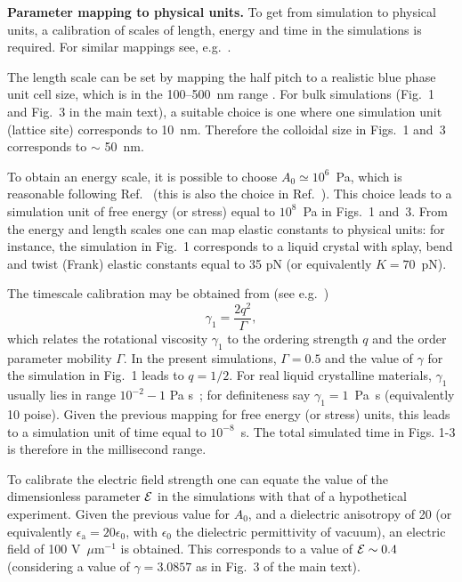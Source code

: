 \documentclass[12pt,twoside]{article}
\begin{document}
\noindent
\textbf{Parameter mapping to physical units.}
To get from simulation to physical units, a calibration of scales of
length, energy and time in the simulations is required. For similar
mappings see,
e.g.~\cite{denniston2}.

The length scale can be set by mapping the half pitch to a realistic blue
phase unit cell size, which is in the 100--500~nm range \cite{blue1}. 
For bulk simulations (Fig.~1 and Fig.~3 in the main text), a suitable choice
is one where one simulation unit (lattice site) corresponds to 10~nm. Therefore
the colloidal size in Figs.~1 and~3 corresponds to $\sim$ 50~nm. 

To obtain an energy scale, it is possible to choose $A_0 \simeq 10^6$~Pa,
which is reasonable following Ref.~\cite{blue1} (this is also the choice in
Ref.~\cite{oliver2}). This choice leads to a simulation unit of
free energy (or stress) equal to $10^{8}$~Pa in Figs.~1 and~3.
From the energy and length scales one can map elastic constants to
physical units: for instance, the simulation in Fig.~1 corresponds to
a liquid crystal with splay, bend and twist (Frank) elastic constants
equal to 35 pN (or equivalently $K=70$~pN).

The timescale calibration may be obtained from (see e.g.~\cite{denniston})
\begin{equation}
\gamma_1=\frac{2q^2}{\mathit{\Gamma}},
\end{equation}
which relates the rotational viscosity $\gamma_1$ to the ordering strength
$q$ and the order parameter mobility $\mathit{\Gamma}$.
In the present simulations, $\mathit{\Gamma} = 0.5$ and the value of $\gamma$
for the simulation in Fig.~1 leads to $q=1/2$.   
For real liquid crystalline materials, $\gamma_1$ usually lies in range
$10^{-2}-1$ Pa s~\cite{deGennes}; for definiteness say
$\gamma_1 = 1$~Pa~s (equivalently 10 poise). Given the previous mapping for
free energy (or stress) units, this leads to a simulation unit of time equal
to $10^{-8}$~s. The total simulated time in Figs. 1-3 is therefore in the
millisecond range. 

To calibrate the electric field strength 
one can equate the value of the dimensionless parameter ${\cal E}$ in the 
simulations with that of a hypothetical experiment.
Given the previous value for $A_0$, and a dielectric anisotropy of 20
(or equivalently $\epsilon_\mathrm{a}=20\epsilon_0$, with $\epsilon_0$ the
dielectric permittivity of vacuum), an electric field
of 100 V~$\mu$m$^{-1}$ is obtained. This corresponds to a value of
${\cal E}\sim 0.4$ (considering a value of $\gamma=3.0857$ as in
Fig.~3 of the main text).
\end{document}
